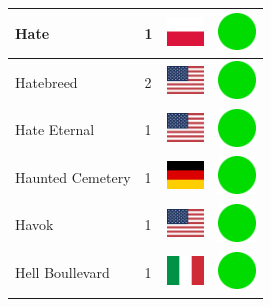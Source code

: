 \documentclass[12pt, a4paper, twoside]{report}
\begin{document}
\begin{center}
\begin{longtable}{|p{5cm}|p{2cm}|p{2cm}|p{2cm}|}
			Hate & 1 & \includegraphics[width=1cm]{4x3/pl} & \includegraphics[width=1cm]{likes/y} \\ \hline
			Hatebreed & 2 & \includegraphics[width=1cm]{4x3/us} & \includegraphics[width=1cm]{likes/y} \\ \hline
			Hate Eternal & 1 & \includegraphics[width=1cm]{4x3/us} & \includegraphics[width=1cm]{likes/y} \\ \hline
			Haunted Cemetery & 1 & \includegraphics[width=1cm]{4x3/de} & \includegraphics[width=1cm]{likes/y} \\ \hline
			Havok & 1 & \includegraphics[width=1cm]{4x3/us} & \includegraphics[width=1cm]{likes/y} \\ \hline
			Hell Boullevard & 1 & \includegraphics[width=1cm]{4x3/it} & \includegraphics[width=1cm]{likes/y} \\ \hline

\end{longtable}
\end{center}
\end{document}
